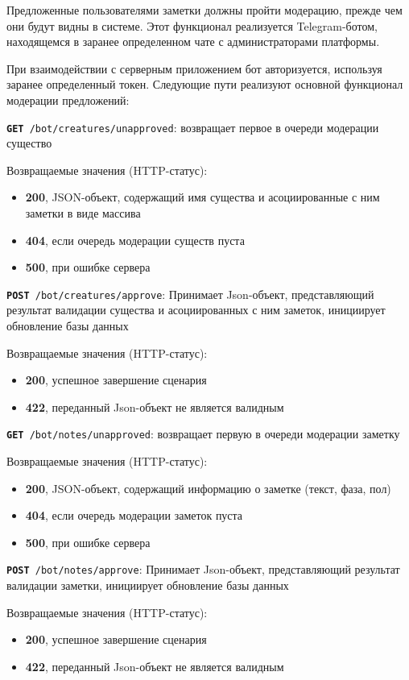 \documentclass[12pt, a4paper]{article}
\begin{document}
Предложенные пользователями заметки должны пройти модерацию, прежде чем они будут видны в системе.
Этот функционал реализуется Telegram-ботом, находящемся в заранее определенном чате с администраторами платформы.

При взаимодействии с серверным приложением бот авторизуется, используя заранее определенный токен.
Следующие пути реализуют основной функционал модерации предложений:

\texttt{\textbf{GET} /bot/creatures/unapproved}: возвращает первое в очереди модерации существо

Возвращаемые значения (HTTP-статус):
\begin{itemize}[noitemsep,topsep=0pt]
\item \textbf{200}, JSON-объект, содержащий имя существа и асоциированные с ним заметки в виде массива
\item \textbf{404}, если очередь модерации существ пуста
\item \textbf{500}, при ошибке сервера
\end{itemize}

\texttt{\textbf{POST} /bot/creatures/approve}: Принимает Json-объект, представляющий результат валидации
существа и асоциированных с ним заметок, инициирует обновление базы данных

Возвращаемые значения (HTTP-статус):
\begin{itemize}[noitemsep,topsep=0pt]
\item \textbf{200}, успешное завершение сценария
\item \textbf{422}, переданный Json-объект не является валидным
\end{itemize}

\texttt{\textbf{GET} /bot/notes/unapproved}: возвращает первую в очереди модерации заметку

Возвращаемые значения (HTTP-статус):
\begin{itemize}[noitemsep,topsep=0pt]
\item \textbf{200}, JSON-объект, содержащий информацию о заметке (текст, фаза, пол)
\item \textbf{404}, если очередь модерации заметок пуста
\item \textbf{500}, при ошибке сервера
\end{itemize}

\texttt{\textbf{POST} /bot/notes/approve}: Принимает Json-объект, представляющий результат валидации
заметки, инициирует обновление базы данных

Возвращаемые значения (HTTP-статус):
\begin{itemize}[noitemsep,topsep=0pt]
\item \textbf{200}, успешное завершение сценария
\item \textbf{422}, переданный Json-объект не является валидным
\end{itemize}
\end{document}
